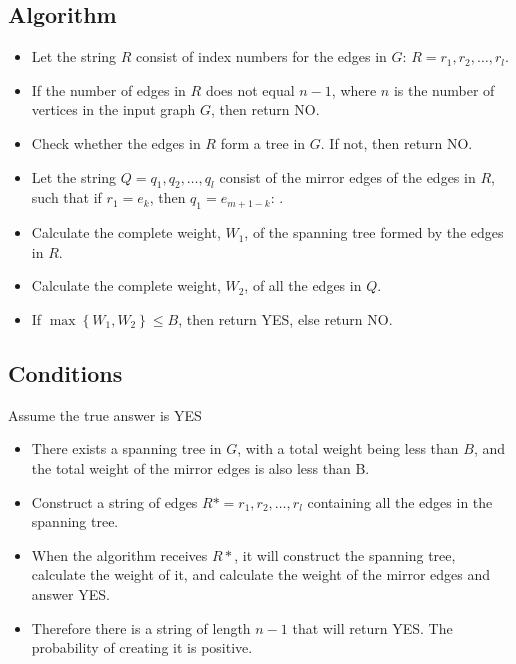 \subsection{Algorithm}
\begin{itemize}
\item Let the string $R$ consist of index numbers for the edges in $G$: $R = r_1,r_2,\dots,r_l$.

\item If the number of edges in $R$ does not equal $n-1$, where $n$ is the number of vertices in the input graph $G$, then return NO.

\item Check whether the edges in $R$ form a tree in $G$. If not, then return NO.

\item Let the string $Q = q_1,q_2,\dots ,q_l$ consist of the mirror edges of the edges in $R$, such that if $r_1=e_k$, then $q_1=e_{m+1-k}$: . 

\item Calculate the complete weight, $W_1$, of the spanning tree formed by the edges in $R$.

\item Calculate the complete weight, $W_2$, of all the edges in $Q$.

\item If $\max \left\{W_1,W_2\right\}  \leq B$, then return YES, else return NO.\\

\end{itemize}

\subsection{Conditions}
Assume the true answer is YES

\begin{itemize}

\item There exists a spanning tree in $G$, with a total weight being less than $B$, and the total weight of the mirror edges is also less than B.

\item Construct a string of edges $R* = r_1,r_2, \dots ,r_l$ containing all the edges in the spanning tree.

\item When the algorithm receives $R*$, it will construct the spanning tree, calculate the weight of it, and calculate the weight of the mirror edges and answer YES.

\item Therefore there is a string of length $n-1$ that will return YES. The probability of creating it is positive.

\end{itemize}


